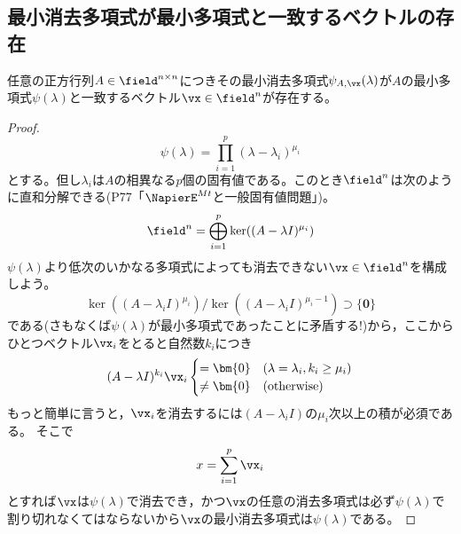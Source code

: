         \subsection{最小消去多項式が最小多項式と一致するベクトルの存在}
            \begin{shadebox}
                任意の正方行列$A\in\field^{n\times n}$につきその最小消去多項式$\psi_{A,\vx}(\lambda)$が$A$の最小多項式$\psi(\lambda)$と一致するベクトル$\vx\in\field^n$が存在する。
            \end{shadebox}
            \begin{proof}
                \[\psi(\lambda) = \prod_{i=1}^{p}{(\lambda-\lambda_i)^{\mu_i}}\]
                とする。但し$\lambda_i$は$A$の相異なる$p$個の固有値である。このとき$\field^n$は次のように直和分解できる(\cite{新微分方程式対話}\;P77\;「$\NapierE^{Mt}$と一般固有値問題」)。
                \[\field^n = \bigoplus_{i=1}^p{\ker((A-\lambda I)^{\mu_i})}\]
                $\psi(\lambda)$より低次のいかなる多項式によっても消去できない$\vx\in\field^n$を構成しよう。
                \[\ker((A-\lambda_i I)^{\mu_i})/\ker((A-\lambda_i I)^{\mu_i-1})\supset\{\bm{0}\}\]
                である(さもなくば$\psi(\lambda)$が最小多項式であったことに矛盾する!)から，ここからひとつベクトル$\vx_i$をとると自然数$k_i$につき
                \[
                    (A-\lambda I)^{k_i}\vx_i
                    \begin{cases}
                        =\bm{0} & (\lambda=\lambda_i,k_i\geq\mu_i)\\
                        \neq\bm{0} & (\mathrm{otherwise})
                    \end{cases}
                \]
                もっと簡単に言うと，$\vx_i$を消去するには$(A-\lambda_i I)$の$\mu_i$次以上の積が必須である。
                そこで
                \[x = \sum_{i=1}^{p}{\vx_i}\]
                とすれば$\vx$は$\psi(\lambda)$で消去でき，かつ$\vx$の任意の消去多項式は必ず$\psi(\lambda)$で割り切れなくてはならないから$\vx$の最小消去多項式は$\psi(\lambda)$である。
            \end{proof}
